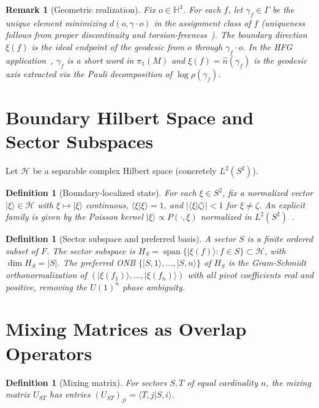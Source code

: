 \documentclass[11pt,a4paper]{article}
\newtheorem{definition}[theorem]{Definition}
\newtheorem{remark}[theorem]{Remark}
\begin{document}
\begin{remark}[Geometric realization]
Fix $o\in\mathbb{H}^3$. For each $f$, let $\gamma_f\in\Gamma$ be the
unique element minimizing $d(o,\gamma\cdot o)$ in the assignment class
of $f$ (uniqueness follows from proper discontinuity and
torsion-freeness~\cite{BridsonHaefliger}).
The boundary direction $\xi(f)$ is the ideal endpoint of the geodesic
from $o$ through $\gamma_f\cdot o$.
In the HFG application~\cite{Gentry:CKM,Gentry:PMNS},
$\gamma_f$ is a short word in $\pi_1(M)$ and $\xi(f)=\hat{n}(\gamma_f)$
is the geodesic axis extracted via the Pauli decomposition of
$\log\rho(\gamma_f)$.
\end{remark}

\section{Boundary Hilbert Space and Sector Subspaces}
\label{sec:boundary}

Let $\mathcal{H}$ be a separable complex Hilbert space (concretely $L^2(S^2)$).

\begin{definition}[Boundary-localized state]
For each $\xi\in S^2$, fix a normalized vector $|\xi\rangle\in\mathcal{H}$
with $\xi\mapsto|\xi\rangle$ continuous, $\langle\xi|\xi\rangle=1$,
and $|\langle\xi|\zeta\rangle|<1$ for $\xi\neq\zeta$.
An explicit family is given by the Poisson kernel
$|\xi\rangle\propto P(\cdot,\xi)$ normalized in $L^2(S^2)$~\cite{Ratcliffe}.
\end{definition}

\begin{definition}[Sector subspace and preferred basis]
A \emph{sector} $S$ is a finite ordered subset of $F$.
The \emph{sector subspace} is
$H_S=\operatorname{span}\{|\xi(f)\rangle:f\in S\}\subset\mathcal{H}$,
with $\dim H_S=|S|$.
The \emph{preferred ONB} $\{|S,1\rangle,\ldots,|S,n\rangle\}$ of $H_S$
is the Gram-Schmidt orthonormalization of
$(|\xi(f_1)\rangle,\ldots,|\xi(f_n)\rangle)$
with all pivot coefficients real and positive,
removing the $U(1)^n$ phase ambiguity.
\end{definition}

\section{Mixing Matrices as Overlap Operators}
\label{sec:mixing}

\begin{definition}[Mixing matrix]
For sectors $S,T$ of equal cardinality $n$, the \emph{mixing matrix}
$U_{ST}$ has entries $(U_{ST})_{ji}=\langle T,j|S,i\rangle$.
\end{definition}
\end{document}
